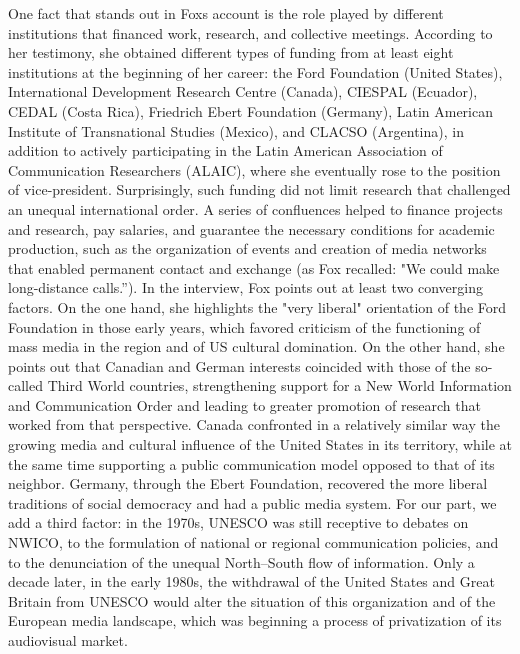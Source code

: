 \documentclass{tufte-handout}
\begin{document}
One fact that stands out in Fox\textquotesingle s account is the role
played by different institutions that financed work, research, and
collective meetings. According to her testimony, she obtained different
types of funding from at least eight institutions at the beginning of
her career: the Ford Foundation (United States), International
Development Research Centre (Canada), CIESPAL (Ecuador), CEDAL (Costa
Rica), Friedrich Ebert Foundation (Germany), Latin American Institute of
Transnational Studies (Mexico), and CLACSO (Argentina), in addition to
actively participating in the Latin American Association of
Communication Researchers (ALAIC), where she eventually rose to the
position of vice-president. Surprisingly, such funding did not limit
research that challenged an unequal international order. A series of
confluences helped to finance projects and research, pay salaries, and
guarantee the necessary conditions for academic production, such as the
organization of events and creation of media networks that enabled
permanent contact and exchange (as Fox recalled: "We could make
long-distance calls.''). In the interview, Fox points out at least two
converging factors. On the one hand, she highlights the "very liberal"
orientation of the Ford Foundation in those early years, which favored
criticism of the functioning of mass media in the region and of US
cultural domination. On the other hand, she points out that Canadian and
German interests coincided with those of the so-called Third World
countries, strengthening support for a New World Information and
Communication Order and leading to greater promotion of research that
worked from that perspective. Canada confronted in a relatively similar
way the growing media and cultural influence of the United States in its
territory, while at the same time supporting a public communication
model opposed to that of its neighbor. Germany, through the Ebert
Foundation, recovered the more liberal traditions of social democracy
and had a public media system. For our part, we add a third factor: in
the 1970s, UNESCO was still receptive to debates on NWICO, to the
formulation of national or regional communication policies, and to the
denunciation of the unequal North--South flow of information. Only a
decade later, in the early 1980s, the withdrawal of the United States
and Great Britain from UNESCO would alter the situation of this
organization and of the European media landscape, which was beginning a
process of privatization of its audiovisual market.
\end{document}
